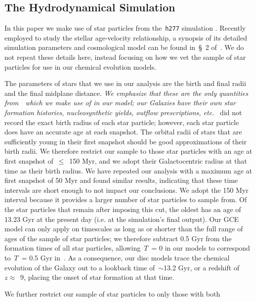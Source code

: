 \documentclass[draft2.tex]{subfiles}
\begin{document}
\subsection{The Hydrodynamical Simulation} 
\label{sec:methods:h277} 
In this paper we make use of star particles from the~\texttt{h277} simulation 
\citep{Christensen2012, Zolotov2012, Loebman2012, Loebman2014, Brooks2014}. 
Recently employed to study the stellar age-velocity relationship, a synopsis of 
its detailed simulation parameters and cosmological model can be found in~\S~2 
of~\citet{Bird2021}. 
We do not repeat these details here, instead focusing on how we vet the sample 
of star particles for use in our chemical evolution models. 
\par 
The parameters of stars that we use in our analysis are the birth and final 
radii and the final midplane distance. 
{\color{red}\textit{
	We emphasize that these are the only quantities from~\hsim~which we make 
	use of in our model; our Galaxies have their own star formation histories, 
	nucleosynthetic yields, outflow prescriptions, etc.
}}
\hsim~did not record the exact birth radius of each star particle; however, 
each star particle does have an accurate age at each snapshot. 
The orbital radii of stars that are sufficiently young in their first snapshot 
should be good approximations of their birth radii. 
We therefore restrict our sample to those star particles with an age at first 
snapshot of~$\leq$~150 Myr, and we adopt their Galactocentric radius at that 
time as their birth radius. 
We have repeated our analysis with a maximum age at first snapshot of 50 
Myr and found similar results, indicating that these time intervals are short 
enough to not impact our conclusions. 
We adopt the 150 Myr interval because it provides a larger number of star 
particles to sample from. 
Of the star particles that remain after imposing this cut, the oldest has an 
age of 13.23 Gyr at the present day (i.e. at the simulation's final output). 
Our GCE model can only apply on timescales as long as or shorter than the full 
range of ages of the sample of star particles; we therefore subtract 0.5 Gyr 
from the formation times of all star particles, allowing~$T$~= 0 in our models 
to correspond to~$T$~= 0.5 Gyr in~\hsim. 
As a consequence, our disc models trace the chemical evolution of the Galaxy 
out to a lookback time of~$\sim$13.2 Gyr, or a redshift of~$z \approx$~9, 
placing the onset of star formation at that time. 
\par 
We further restrict our sample of star particles to only those with both 
\end{document}
